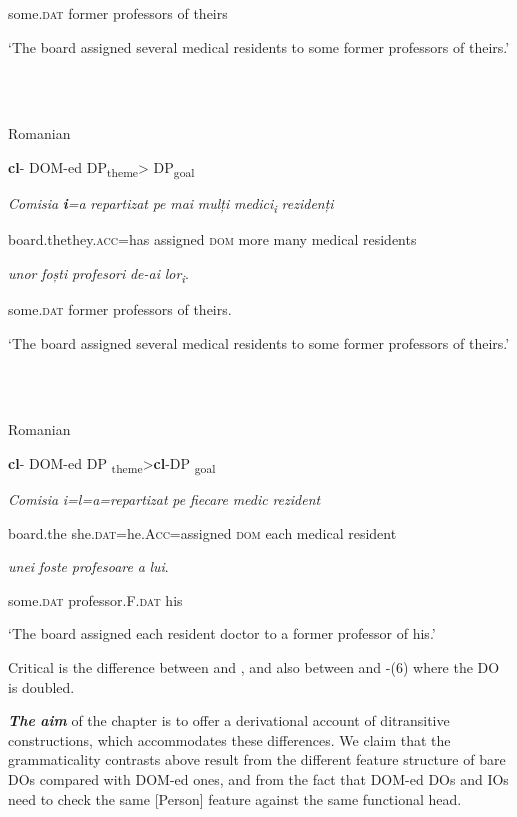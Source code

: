 \documentclass[output=paper,modfonts,nonflat]{langsci/langscibook}
\begin{document}
some.\textsc{dat}  former professors   of theirs

‘The board assigned several medical residents to some former professors of theirs.’

\ea%
    \label{ex:key:5}
    \gll\\
        \\
    \glt
    \z

          Romanian

\textbf{cl}{}- DOM-ed DP\textsubscript{theme}> DP\textsubscript{goal}

\textit{Comisia}  \textbf{\textit{i}}\textit{=a} \textit{repartizat}    \textit{pe}  \textit{mai}  \textit{mulți}  \textit{medici\textsubscript{i}    }\textit{rezidenți}

board.thethey.\textsc{acc=}has assigned   \textsc{dom} more many medical residents

\textit{unor}     \textit{foști}          \textit{profesori}    \textit{de-ai} \textit{lor\textsubscript{i}}.

some.\textsc{dat} former     professors   of theirs.

‘The board assigned several medical residents to some former professors of theirs.’

\ea%
    \label{ex:key:6}
    \gll\\
        \\
    \glt
    \z

          Romanian

\textbf{cl}{}- DOM-ed DP \textsubscript{theme}>\textbf{cl}{}-DP \textsubscript{goal} 

\textit{Comisia}  \textit{i=l=a=repartizat}      \textit{pe} \textit{fiecare} \textit{medic} \textit{rezident}

board.the  she.\textsc{dat}=he.\textsc{Acc}=assigned \textsc{dom} each medical resident 

\textit{unei} \textit{foste} \textit{profesoare}    \textit{a} \textit{lui}.

some.\textsc{dat} professor.F.\textsc{dat}  his

‘The board assigned each resident doctor to a former professor of his.’

Critical is the difference between  and , and also between  and -(6) where the DO is doubled.

\textbf{\textit{The} \textit{aim} }of the chapter is to offer a derivational account of ditransitive constructions, which accommodates these differences. We claim that the grammaticality contrasts above result from the different feature structure of bare DOs compared with DOM-ed ones, and from the fact that DOM-ed DOs and IOs need to check the same [Person] feature against the same functional head.
\end{document}
